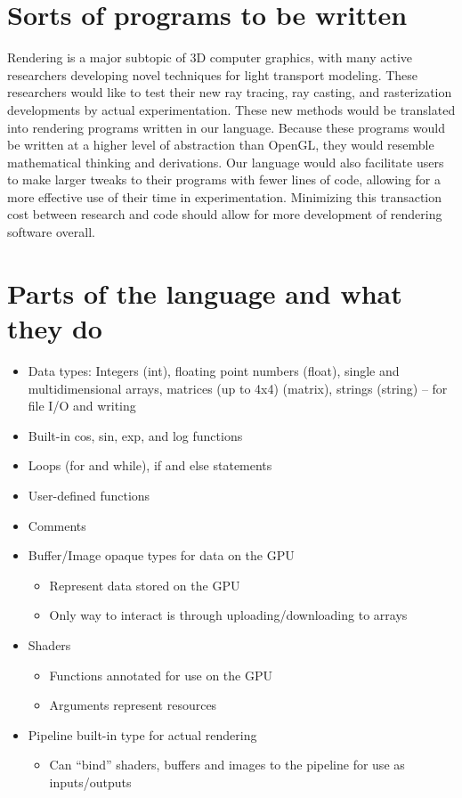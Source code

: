 \documentclass[11pt]{article}
\begin{document}
\section{Sorts of programs to be written}
    Rendering is a major subtopic of 3D computer graphics, with many active 
    researchers developing novel techniques for light transport modeling. These 
    researchers would like to test their new ray tracing, ray casting, and 
    rasterization developments by actual experimentation. These new methods would be 
    translated into rendering programs written in our language. Because these 
    programs would be written at a higher level of abstraction than OpenGL, they 
    would resemble mathematical thinking and derivations. Our language would also 
    facilitate users to make larger tweaks to their programs with fewer lines of 
    code, allowing for a more effective use of their time in experimentation. 
    Minimizing this transaction cost between research and code should allow for more 
    development of rendering software overall.


\section{Parts of the language and what they do}
    \begin{itemize}
        \item Data types: Integers (int), floating point numbers (float), single and multidimensional arrays, matrices (up to 4x4) (matrix), strings (string) -- for file I/O and writing
        \item  Built-in cos, sin, exp, and log functions
        \item  Loops (for and while), if and else statements
        \item  User-defined functions
        \item  Comments
        \item  Buffer/Image opaque types for data on the GPU
            \begin{itemize}
            \item Represent data stored on the GPU
            \item Only way to interact is through uploading/downloading to arrays
            \end{itemize}
        \item Shaders
            \begin{itemize}
            \item Functions annotated for use on the GPU
            \item Arguments represent resources 
            \end{itemize}
        \item Pipeline built-in type for actual rendering
            \begin{itemize}
                \item  Can “bind” shaders, buffers and images to the pipeline for use as inputs/outputs
            \end{itemize}
    \end{itemize}
\end{document}
